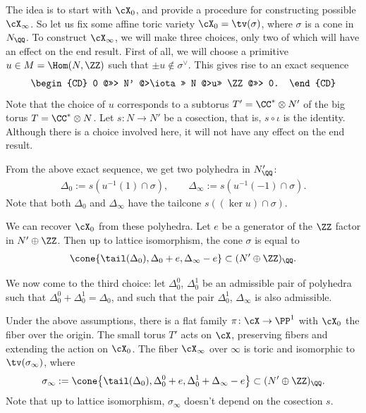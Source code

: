 The idea is to start with $\cX_0$, and provide a procedure for constructing possible $\cX_\infty$. So let us f\/ix some af\/f\/ine toric variety $\cX_0=\tv(\sigma)$, where $\sigma$ is a cone in $N_\QQ$. To construct $\cX_\infty$, we will make three choices, only two of which will have an ef\/fect on the end result. First of all, we will choose a primitive $u\in M=\Hom(N,\ZZ)$ such that $\pm u\notin\sigma^\vee$. This gives rise to an exact sequence
\begin{gather*}
\begin{CD}
0 @>>> N' @>\iota >> N @>u>> \ZZ @>>> 0.
\end{CD}
\end{gather*}
Note that the choice of $u$ corresponds to a subtorus $T'=\CC^*\otimes N'$ of the big torus $T=\CC^*\otimes N$.
Let $s\colon N\to N'$ be a cosection, that is, $s\circ\iota$ is the identity. Although there is a choice involved here, it will not have any ef\/fect on the end result.

From the above exact sequence, we get two polyhedra in $N_\QQ'$:
\begin{gather*}
\Delta_0 :=s(u^{-1}(1)\cap\sigma),\qquad
\Delta_\infty :=s(u^{-1}(-1)\cap\sigma).
\end{gather*}
Note that both $\Delta_0$ and $\Delta_\infty$ have the tailcone $s( (\ker u) \cap \sigma)$.

We can recover $\cX_0$ from these polyhedra. Let $e$ be a generator of the $\ZZ$ factor in $N' \oplus \ZZ$. Then up to lattice isomorphism, the cone $\sigma$ is equal to
\begin{gather*}
\cone \{\tail(\Delta_0),\Delta_0+e,\Delta_\infty-e\}\subset(N'\oplus \ZZ)_\QQ.
\end{gather*}

We now come to the third choice: let $\Delta_0^0$, $\Delta_0^1$ be an admissible pair of polyhedra such that $\Delta_0^0+\Delta_0^1=\Delta_0$, and such that the pair $\Delta_0^1$, $\Delta_\infty$ is also admissible.

\begin{Theorem}\label{thm:family}
Under the above assumptions, there is a flat family \mbox{$\pi\colon \cX \to\PP^1$} with $\cX_0$ the fiber over the origin. The small torus $T'$ acts on $\cX$, preserving fibers and extending the action on $\cX_0$. The fiber $\cX_\infty$ over $\infty$ is toric and isomorphic to $\tv(\sigma_\infty)$, where
\begin{gather*}
\sigma_\infty:=\cone \big\{\tail(\Delta_0),\Delta_0^0+e,\Delta_0^1+\Delta_\infty-e\big\}\subset(N'\oplus \ZZ)_\QQ.
\end{gather*}
Note that up to lattice isomorphism, $\sigma_\infty$ doesn't depend on the cosection $s$.
\end{Theorem}

